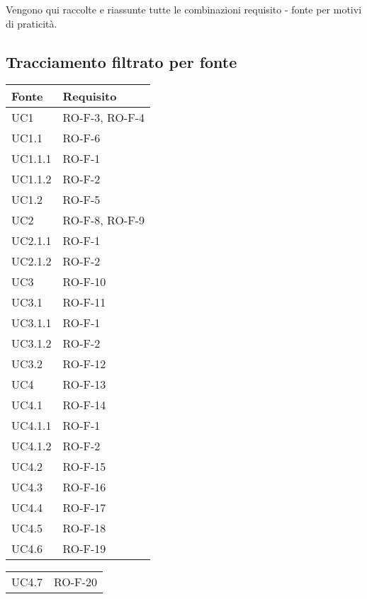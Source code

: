 Vengono qui raccolte e riassunte tutte le combinazioni requisito - fonte per motivi di praticità.
\subsection{Tracciamento filtrato per fonte}
\begin{center}
\renewcommand{\arraystretch}{1.8} %
\begin{tabular}{ |m{8em}|m{13em}| }
    \hline
    \textbf{Fonte} & \textbf{Requisito} \\
    \hline
    UC1         &   RO-F-3, RO-F-4 \\
    \hline
    UC1.1       &   RO-F-6 \\
    \hline
    UC1.1.1     &   RO-F-1 \\
    \hline
    UC1.1.2     &   RO-F-2 \\
    \hline
    UC1.2       &   RO-F-5 \\
    \hline
    UC2         &   RO-F-8, RO-F-9 \\
    \hline
    UC2.1.1     &   RO-F-1 \\
    \hline
    UC2.1.2     &   RO-F-2 \\
    \hline
    UC3         &   RO-F-10 \\
    \hline
    UC3.1       &   RO-F-11 \\
    \hline
    UC3.1.1     &   RO-F-1 \\
    \hline
    UC3.1.2     &   RO-F-2 \\
    \hline
    UC3.2       &   RO-F-12 \\
    \hline
    UC4         &   RO-F-13 \\
    \hline
    UC4.1       &   RO-F-14 \\
    \hline
    UC4.1.1     &   RO-F-1 \\
    \hline
    UC4.1.2     &   RO-F-2 \\
    \hline 
    UC4.2       &   RO-F-15 \\
    \hline
    UC4.3       &   RO-F-16 \\
    \hline
    UC4.4       &   RO-F-17 \\
    \hline
    UC4.5       &   RO-F-18 \\
    \hline
    UC4.6       &   RO-F-19 \\
    \hline
    \end{tabular}
    \newpage
    \begin{tabular}{ |m{8em}|m{13em}| }
    \hline
    UC4.7       &   RO-F-20 \\

\end{tabular}
\end{center}
